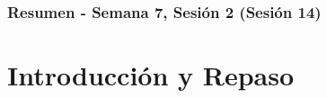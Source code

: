 \documentclass[10pt]{beamer}
\begin{document}
\myfront{}

\begin{frame}
  \titlepage
\end{frame}

\begin{frame}
  \frametitle{Resumen - Semana 7, Sesión 2 (Sesión 14)}
  \tableofcontents
\end{frame}


\section{Introducción y Repaso}
\end{document}
